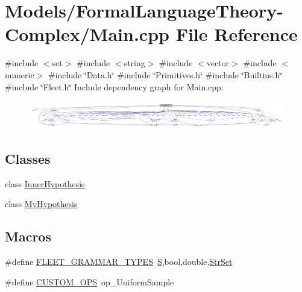\hypertarget{_formal_language_theory-_complex_2_main_8cpp}{}\section{Models/\+Formal\+Language\+Theory-\/\+Complex/\+Main.cpp File Reference}
\label{_formal_language_theory-_complex_2_main_8cpp}
{\ttfamily \#include $<$set$>$}\newline
{\ttfamily \#include $<$string$>$}\newline
{\ttfamily \#include $<$vector$>$}\newline
{\ttfamily \#include $<$numeric$>$}\newline
{\ttfamily \#include \char`\"{}Data.\+h\char`\"{}}\newline
{\ttfamily \#include \char`\"{}Primitives.\+h\char`\"{}}\newline
{\ttfamily \#include \char`\"{}Builtins.\+h\char`\"{}}\newline
{\ttfamily \#include \char`\"{}Fleet.\+h\char`\"{}}\newline
Include dependency graph for Main.\+cpp\+:
\nopagebreak
\begin{figure}[H]
\begin{center}
\leavevmode
\includegraphics[width=350pt]{_formal_language_theory-_complex_2_main_8cpp__incl}
\end{center}
\end{figure}
\subsection*{Classes}
\begin{DoxyCompactItemize}
\item 
class \hyperlink{class_inner_hypothesis}{Inner\+Hypothesis}
\item 
class \hyperlink{class_my_hypothesis}{My\+Hypothesis}
\end{DoxyCompactItemize}
\subsection*{Macros}
\begin{DoxyCompactItemize}
\item 
\#define \hyperlink{_formal_language_theory-_complex_2_main_8cpp_a89fb8e7826ca09e23da0ce4b39ee03c0}{F\+L\+E\+E\+T\+\_\+\+G\+R\+A\+M\+M\+A\+R\+\_\+\+T\+Y\+P\+ES}~\hyperlink{_formal_language_theory-_complex_2_main_8cpp_a51c40915539205f0b5add30b0d68a4cb}{S},bool,double,\hyperlink{_formal_language_theory-_complex_2_main_8cpp_a809d982ed20fa378f251596c3b5ad6b7}{Str\+Set}
\item 
\#define \hyperlink{_formal_language_theory-_complex_2_main_8cpp_a1287a8584548a58c8bff414efbac2ac4}{C\+U\+S\+T\+O\+M\+\_\+\+O\+PS}~op\+\_\+\+Uniform\+Sample
\end{DoxyCompactItemize}
